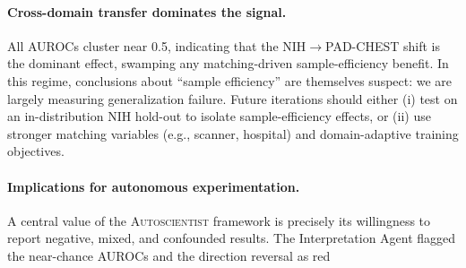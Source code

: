 \documentclass[11pt]{article}
\begin{document}
\paragraph{Cross-domain transfer dominates the signal.} All AUROCs cluster near 0.5, indicating that the NIH$\rightarrow$PAD-CHEST shift is the dominant effect, swamping any matching-driven sample-efficiency benefit. In this regime, conclusions about ``sample efficiency'' are themselves suspect: we are largely measuring generalization failure. Future iterations should either (i) test on an in-distribution NIH hold-out to isolate sample-efficiency effects, or (ii) use stronger matching variables (e.g., scanner, hospital) and domain-adaptive training objectives.

\paragraph{Implications for autonomous experimentation.} A central value of the \textsc{Autoscientist} framework is precisely its willingness to report negative, mixed, and confounded results. The Interpretation Agent flagged the near-chance AUROCs and the direction reversal as red
\end{document}
